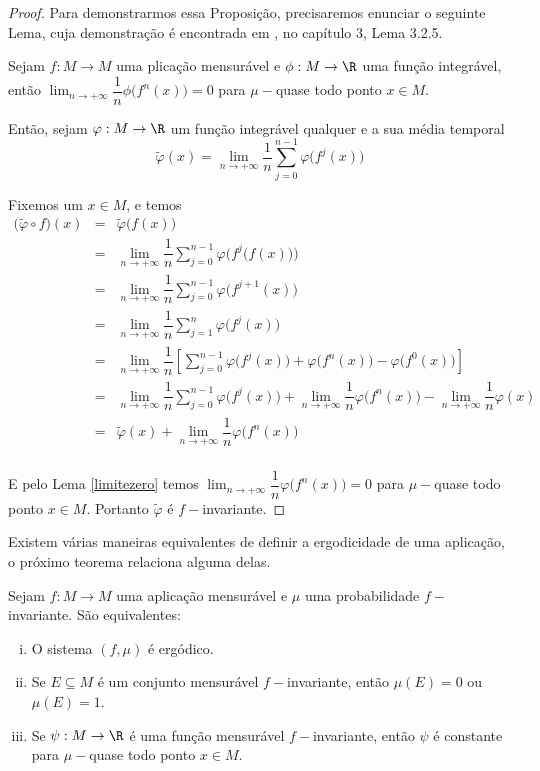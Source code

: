 \begin{proof} Para demonstrarmos essa Proposição, precisaremos enunciar o seguinte Lema, cuja demonstração é encontrada em \cite{viana}, no capítulo 3, Lema 3.2.5.

\begin{lema}\label{limitezero} Sejam $f:M\to M$ uma plicação mensurável e $\phi:M\to\R$ uma função integrável, então $\lim_{n\to+\infty}\dfrac{1}{n}\phi\big(f^n(x)\big)=0$ para $\mu-$quase todo ponto $x\in M$.
\end{lema}

Então, sejam $\varphi:M\to\R$ um função integrável qualquer e a sua média temporal
\begin{equation*}
\tilde{\varphi}(x) = \lim_{n\to+\infty}\dfrac{1}{n}\sum_{j=0}^{n-1}{\varphi\big(f^j(x)\big)}
\end{equation*} 

Fixemos um $x\in M$, e temos
\begin{eqnarray*}
\big(\tilde{\varphi}\circ f\big)(x) & = & \tilde{\varphi}\big(f(x)\big)\\
& = & \lim_{n\to+\infty}\dfrac{1}{n}\sum_{j=0}^{n-1}{\varphi\Big(f^j\big(f(x)\big)\Big)}\\
& = & \lim_{n\to+\infty}\dfrac{1}{n}\sum_{j=0}^{n-1}{\varphi\big(f^{j+1}(x)\big)}\\
& = & \lim_{n\to+\infty}\dfrac{1}{n}\sum_{j=1}^{n}{\varphi\big(f^{j}(x)\big)}\\
& = & \lim_{n\to+\infty}\dfrac{1}{n}\left[\sum_{j=0}^{n-1}{\varphi\big(f^{j}(x)\big)}+\varphi\big(f^n(x)\big)-\varphi\big(f^0(x)\big)\right]\\
& = & \lim_{n\to+\infty}\dfrac{1}{n}\sum_{j=0}^{n-1}{\varphi\big(f^{j}(x)\big)}+\lim_{n\to+\infty}\dfrac{1}{n}\varphi\big(f^n(x)\big)-\lim_{n\to+\infty}\dfrac{1}{n}\varphi(x)\\
& = & \tilde{\varphi}(x)+\lim_{n\to+\infty}\dfrac{1}{n}\varphi\big(f^n(x)\big)\\
\end{eqnarray*}

E pelo Lema \ref{limitezero} temos $\lim_{n\to+\infty}\dfrac{1}{n}\varphi\big(f^n(x)\big)=0$ para $\mu-$quase todo ponto $x\in M$. Portanto $\tilde{\varphi}$ é $f-$invariante. 
\end{proof}

Existem várias maneiras equivalentes de definir a ergodicidade de uma aplicação, o próximo teorema relaciona alguma delas.

\begin{teorema} Sejam $f:M\to M$ uma aplicação mensurável e $\mu$ uma probabilidade $f-$invariante. São equivalentes:
\begin{enumerate}[i)]
\item O sistema $(f,\mu)$ é ergódico.
\item Se $E\subseteq M$ é um conjunto mensurável $f-$invariante, então $\mu(E)=0$ ou $\mu(E)=1$.
\item Se $\psi:M\to\R$ é uma função mensurável $f-$invariante, então $\psi$ é constante para $\mu-$quase todo ponto $x\in M$.
\end{enumerate}
\end{teorema}

